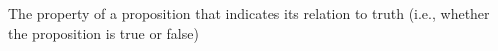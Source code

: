 The property of a proposition that indicates its relation to truth (i.e., whether the proposition is true or false)
